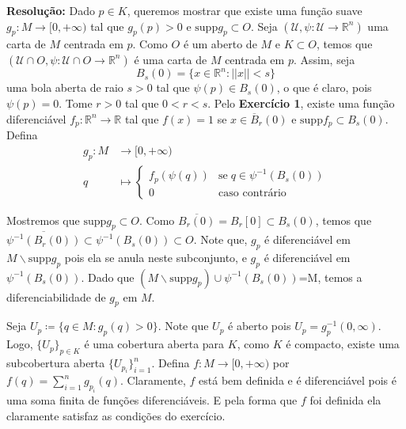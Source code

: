 \documentclass[twoside,openright,titlepage,numbers=noenddot,headinclude,  lineheaders footinclude=true,cleardoublepage=empty,BCOR=5mm,paper=a4,fontsize=12pt ]{scrbook}
\newcommand{\R}{\mathbb R}
\begin{document}
\textbf{Resolução:} 
Dado $p \in K$, queremos mostrar que existe uma função suave $g_p : M \rightarrow [0, + \infty)$ tal que $g_p(p) > 0$ e $\text{supp}g_p \subset O$. 
Seja $(\mathcal{U}, \psi : \mathcal{U}\rightarrow \R^n)$ uma carta de $M$ centrada em $p$. 
Como $O$ é um aberto de $M$ e $K \subset O$, temos que $(\mathcal{U} \cap O , \psi : \mathcal{U} \cap O \rightarrow \R^n)$ é uma carta de $M$ centrada em $p$. 
Assim, seja 
\begin{equation*}
B_s(0) = \{x \in \R^n : ||x || < s\}
\end{equation*} 
uma bola aberta de raio $s > 0$ tal que $\psi(p) \in B_s(0)$, o que é claro, pois $\psi(p) = 0$. 
Tome $r > 0$ tal que $0 < r < s$.
Pelo \textbf{Exercício 1}, existe uma função diferenciável $f_p : \R^n \rightarrow \R$ tal que $f(x) = 1$ se $x \in \overline{B}_r(0)$ e $\text{supp}f_p \subset B_s(0)$. 
Defina 
\begin{align*}
g_p : M &\rightarrow [0, + \infty) \\ 
q &\mapsto \begin{cases}
f_p(\psi(q)) & \text{se}\;  q \in \psi^{-1}(B_s(0)) \\
0  & \text{caso contrário}
\end{cases}
\end{align*}

Mostremos que $\text{supp} g_p \subset O$.
Como $\overline{B_r(0)} = B_r[0] \subset B_s(0)$, temos que $\overline{\psi^{-1}(B_r(0))} \subset \psi^{-1}(B_s(0)) \subset O$. 
Note que, $g_p$ é diferenciável em $M\backslash \mathrm{supp}g_p$ pois ela se anula neste subconjunto, e $g_p$ é diferenciável em $\psi^{-1}(B_s(0))$. 
Dado que $(M\backslash \mathrm{supp} g_p) \cup \psi^{-1}(B_s(0))$=M, temos a diferenciabilidade de $g_p$ em $M$.

Seja $U_p \coloneqq \{q \in M : g_p(q) > 0\}$.
Note que $U_p$ é aberto pois $U_p = g_p^{-1}(0,\infty)$.
Logo, $\{U_p\}_{p \in K}$ é uma cobertura aberta para $K$, como $K$ é compacto, existe uma subcobertura aberta $\{U_{p_i}\}_{i = 1}^n$. 
Defina $f : M \rightarrow [0, + \infty)$ por $f(q) = \sum_{i = 1}^n g_{p_i}(q)$.
Claramente, $f$ está bem definida e é diferenciável pois é uma soma finita de funções diferenciáveis. 
E pela forma que $f$ foi definida ela claramente satisfaz as condições do exercício.
\end{document}
